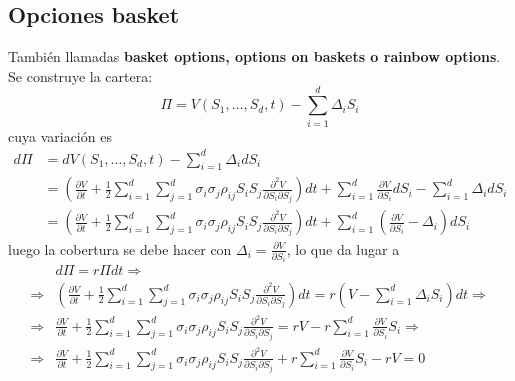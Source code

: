 \subsection{Opciones basket}
También llamadas \textbf{basket options, options on baskets o rainbow options}. Se construye la cartera:
\[
    \Pi = V(S_1, \dots, S_d, t) - \sum_{i=1}^{d} \Delta_i S_i
\]
cuya variación es
\begin{align*}
    d\Pi &= dV(S_1, \dots, S_d, t) - \sum_{i=1}^{d} \Delta_i dS_i \\
    &= \left( \frac{\partial V}{\partial t} + \frac{1}{2} \sum_{i=1}^{d} \sum_{j=1}^{d} \sigma_i \sigma_j \rho_{ij} S_i S_j \frac{\partial^2 V}{\partial S_i \partial S_j} \right) dt + \sum_{i=1}^{d} \frac{\partial V}{\partial S_i} dS_i - \sum_{i=1}^{d} \Delta_i dS_i \\
    &= \left( \frac{\partial V}{\partial t} + \frac{1}{2} \sum_{i=1}^{d} \sum_{j=1}^{d} \sigma_i \sigma_j \rho_{ij} S_i S_j \frac{\partial^2 V}{\partial S_i \partial S_j} \right) dt + \sum_{i=1}^{d} \left( \frac{\partial V}{\partial S_i} - \Delta_i \right) dS_i
\end{align*}
luego la cobertura se debe hacer con $ \Delta_i = \frac{\partial V}{\partial S_i} $, lo que da lugar a
\begin{align*}
    &d\Pi = r \Pi dt \Rightarrow \\
    \Rightarrow &\left( \frac{\partial V}{\partial t} + \frac{1}{2} \sum_{i=1}^{d} \sum_{j=1}^{d} \sigma_i \sigma_j \rho_{ij} S_i S_j \frac{\partial^2 V}{\partial S_i \partial S_j} \right) dt = r \left(V - \sum_{i=1}^{d} \Delta_i S_i \right) dt \Rightarrow \\
    \Rightarrow &\frac{\partial V}{\partial t} + \frac{1}{2} \sum_{i=1}^{d} \sum_{j=1}^{d} \sigma_i \sigma_j \rho_{ij} S_i S_j \frac{\partial^2 V}{\partial S_i \partial S_j} = r V - r \sum_{i=1}^{d} \frac{\partial V}{\partial S_i} S_i \Rightarrow \\
    \Rightarrow &\frac{\partial V}{\partial t} + \frac{1}{2} \sum_{i=1}^{d} \sum_{j=1}^{d} \sigma_i \sigma_j \rho_{ij} S_i S_j \frac{\partial^2 V}{\partial S_i \partial S_j} + r \sum_{i=1}^{d} \frac{\partial V}{\partial S_i} S_i - r V = 0
\end{align*}

